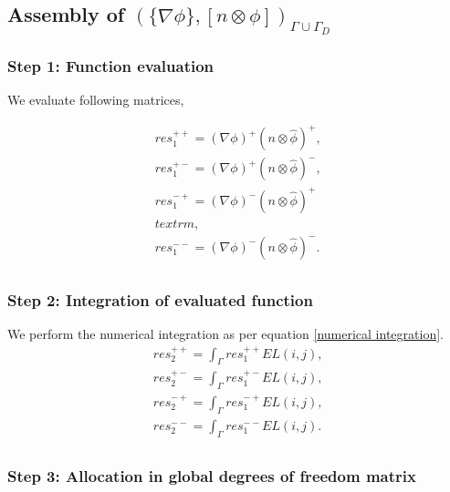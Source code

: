 \documentclass[a4paper,twoside,openright]{book}
\begin{document}
\subsection{Assembly of $(\lbrace \nabla \phi \rbrace, [n \otimes \phi])_{\Gamma \cup \Gamma_D}$}

\subsubsection{Step 1: Function evaluation}

We evaluate following matrices,

\begin{equation}
\begin{split}
res_1^{++} = (\nabla \phi)^+ (n \otimes \hat{\phi})^+ \textrm{,}\\
res_1^{+-} = (\nabla \phi)^+ (n \otimes \hat{\phi})^- \textrm{,}\\
res_1^{-+} = (\nabla \phi)^- (n \otimes \hat{\phi})^+ \\textrm{,}\\
res_1^{--} = (\nabla \phi)^- (n \otimes \hat{\phi})^- \textrm{.}\\
\end{split}
\end{equation}

\subsubsection{Step 2: Integration of evaluated function}

We perform the numerical integration as per equation \eqref{numerical integration}.
\begin{equation}
\begin{split}
res_2^{++} = \int_{\Gamma} res_1^{++} EL(i,j) \textrm{,}\\
res_2^{+-} = \int_{\Gamma} res_1^{+-} EL(i,j) \textrm{,}\\
res_2^{-+} = \int_{\Gamma} res_1^{-+} EL(i,j) \textrm{,}\\
res_2^{--} = \int_{\Gamma} res_1^{--} EL(i,j) \textrm{.}\\
\end{split}
\end{equation}

\subsubsection{Step 3: Allocation in global degrees of freedom matrix}
\end{document}
